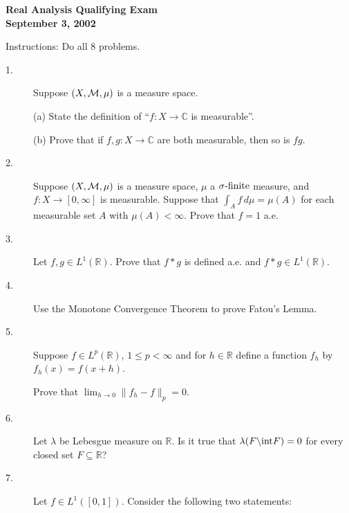 \documentclass[11pt]{article}
\def\ds{\displaystyle}
\def\R{{\mathbb R}}
\def\C{{\mathbb C}}
\def\ds{\displaystyle}
\begin{document}
\begin{large}

\begin{center}
{\bf
Real Analysis Qualifying Exam\\
September 3, 2002
}\end{center}

\vspace{.15in}

Instructions: Do all 8 problems.

\begin{description}

\item[1.] Suppose $(X, \cal{M}, \mu)$ is a measure space. 

(a) State the definition of ``$f:X\to\C$ is measurable''.

\vspace{.1in} (b) Prove that if $f,g:X\to\C$ are both measurable, then so 
is $fg$.

\vspace{.15in}
\item[2.] Suppose $(X, \cal{M}, \mu)$ is a measure 
space, $\mu$ a $\sigma\hbox{-finite}$ measure, and $f:X\to[0,\infty]$ is 
measurable.
Suppose that $\ds\int_A f\,d\mu=\mu(A)$ for each measurable set $A$ with
$\mu(A)<\infty$.
Prove that $f=1$ a.e.


\vspace{.15in}
\item[3.]
Let $f,g\in L^1(\R)$. Prove that $f\ast g$ is defined a.e. and
$f\ast g\in L^1(\R)$.

\vspace{.15in}
\item[4.]
Use the Monotone Convergence Theorem to prove Fatou's Lemma.


\vspace{.15in}
\item[5.]
Suppose $f\in L^p(\R)$, $1\leq p < \infty$ and for
$h\in\R$ define a function $f_h$ by $f_h(x)=f(x+h)$.

\item[\quad]
Prove that $\ds\lim_{h\to 0} \|f_h-f\|_p=0$.

\vspace{.15in}
\item[6.]
Let $\lambda$ be  Lebesgue measure on $\R$.
Is it true that $\lambda(F\backslash \hbox{int} F)=0$
for every closed set $F\subseteq \R$?

\vspace{.15in}
\item[7.]
Let $f\in L^1([0,1])$.
Consider the following two statements:


\end{description}
\end{large}
\end{document}
